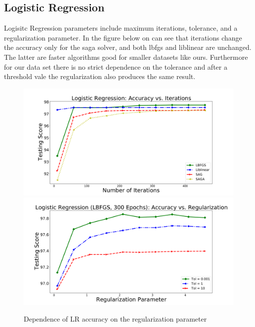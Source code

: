 \subsection{Logistic Regression}

Logisitc Regression parameters include maximum iterations, tolerance, and a regularization parameter. In the figure below on can see that iterations change the accuracy only for the saga solver, and both lbfgs and liblinear are unchanged. The latter are faster algorithms good for smaller datasets like ours. Furthermore for our data set there is no strict dependence on the tolerance and after a threshold vale the regularization also produces the same result.


\begin{figure}[h]
\includegraphics[width=\twopicsp\textwidth]{plots/lr_train.pdf}
\includegraphics[width=\twopicsp\textwidth]{plots/lr_train_reg.pdf}
\caption{Dependence of LR accuracy on the regularization parameter}
\label{fig:LR_accuracy}
\end{figure}

